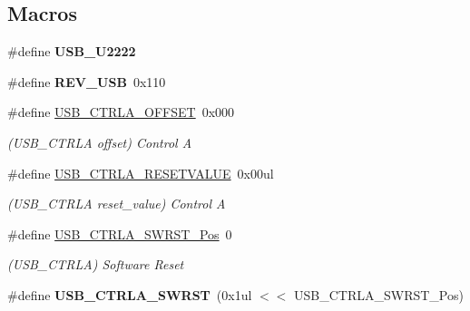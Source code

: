 \subsection*{Macros}
\begin{DoxyCompactItemize}
\item 
\hypertarget{group___s_a_m_l21___u_s_b_ga54b38e346eee20b898e2ef2a21637598}{}\#define {\bfseries U\+S\+B\+\_\+\+U2222}\label{group___s_a_m_l21___u_s_b_ga54b38e346eee20b898e2ef2a21637598}

\item 
\hypertarget{group___s_a_m_l21___u_s_b_ga8f52971c16574d99c80af26aa4f3ab6e}{}\#define {\bfseries R\+E\+V\+\_\+\+U\+S\+B}~0x110\label{group___s_a_m_l21___u_s_b_ga8f52971c16574d99c80af26aa4f3ab6e}

\item 
\hypertarget{group___s_a_m_l21___u_s_b_ga5f5c1d5b9e987a42f466e3a04bdae965}{}\#define \hyperlink{group___s_a_m_l21___u_s_b_ga5f5c1d5b9e987a42f466e3a04bdae965}{U\+S\+B\+\_\+\+C\+T\+R\+L\+A\+\_\+\+O\+F\+F\+S\+E\+T}~0x000\label{group___s_a_m_l21___u_s_b_ga5f5c1d5b9e987a42f466e3a04bdae965}

\begin{DoxyCompactList}\small\item\em (U\+S\+B\+\_\+\+C\+T\+R\+L\+A offset) Control A \end{DoxyCompactList}\item 
\hypertarget{group___s_a_m_l21___u_s_b_gac56d29d49ee12585490772baebdd1f17}{}\#define \hyperlink{group___s_a_m_l21___u_s_b_gac56d29d49ee12585490772baebdd1f17}{U\+S\+B\+\_\+\+C\+T\+R\+L\+A\+\_\+\+R\+E\+S\+E\+T\+V\+A\+L\+U\+E}~0x00ul\label{group___s_a_m_l21___u_s_b_gac56d29d49ee12585490772baebdd1f17}

\begin{DoxyCompactList}\small\item\em (U\+S\+B\+\_\+\+C\+T\+R\+L\+A reset\+\_\+value) Control A \end{DoxyCompactList}\item 
\hypertarget{group___s_a_m_l21___u_s_b_ga14c38886c57df1a80b35bc7803efa91b}{}\#define \hyperlink{group___s_a_m_l21___u_s_b_ga14c38886c57df1a80b35bc7803efa91b}{U\+S\+B\+\_\+\+C\+T\+R\+L\+A\+\_\+\+S\+W\+R\+S\+T\+\_\+\+Pos}~0\label{group___s_a_m_l21___u_s_b_ga14c38886c57df1a80b35bc7803efa91b}

\begin{DoxyCompactList}\small\item\em (U\+S\+B\+\_\+\+C\+T\+R\+L\+A) Software Reset \end{DoxyCompactList}\item 
\hypertarget{group___s_a_m_l21___u_s_b_ga8f2176a471ddb65398be0fd8f2f0927b}{}\#define {\bfseries U\+S\+B\+\_\+\+C\+T\+R\+L\+A\+\_\+\+S\+W\+R\+S\+T}~(0x1ul $<$$<$ U\+S\+B\+\_\+\+C\+T\+R\+L\+A\+\_\+\+S\+W\+R\+S\+T\+\_\+\+Pos)\label{group___s_a_m_l21___u_s_b_ga8f2176a471ddb65398be0fd8f2f0927b}


\end{DoxyCompactItemize}
